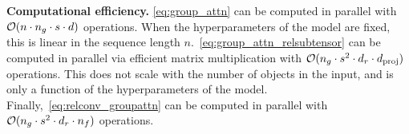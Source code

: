 \textbf{Computational efficiency.} \cref{eq:group_attn} can be computed in parallel with ${\mathcal{O}}(n \cdot n_g \cdot s \cdot d)$ operations. When the hyperparameters of the model are fixed, this is linear in the sequence length $n$.~\cref{eq:group_attn_relsubtensor} can be computed in parallel via efficient matrix multiplication with ${\mathcal{O}}(n_g \cdot s^2 \cdot d_r \cdot d_{\mathrm{proj}})$ operations. This does not scale with the number of objects in the input, and is only a function of the hyperparameters of the model. Finally,~\cref{eq:relconv_groupattn} can be computed in parallel with ${\mathcal{O}}(n_g \cdot s^2 \cdot d_r \cdot n_f)$ operations.
